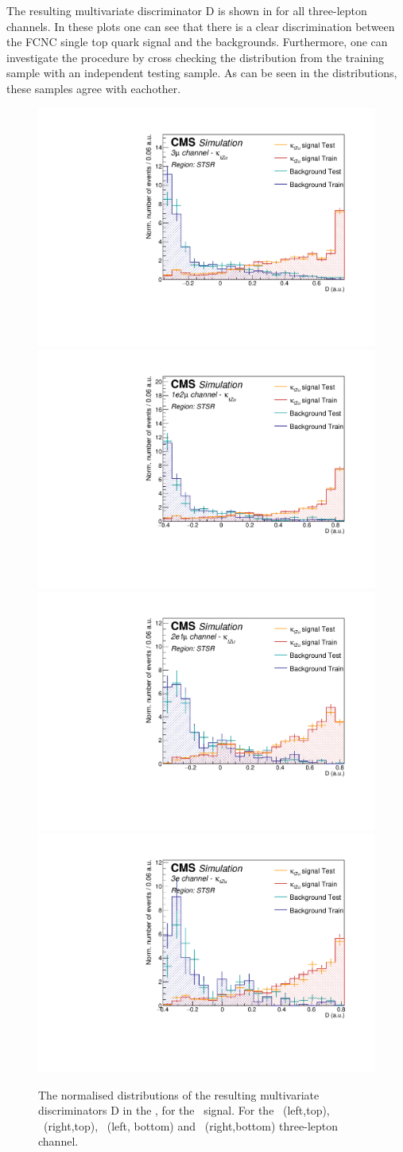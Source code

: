 \clearpage

The resulting multivariate discriminator D is shown in  for all three-lepton channels. In these plots one can see that there is a clear discrimination between the FCNC single top quark signal and the backgrounds. Furthermore, one can investigate the procedure by cross checking the distribution from the training sample with an independent testing sample. As can be seen in the distributions, these samples agree with eachother.
\begin{figure}[htbp]
	\centering
	\includegraphics[width=0.49\linewidth]{6_Search/Figures/PlotsTechnics/SigVsBkgTestZutsingletopuuu}
	\includegraphics[width=0.49\linewidth]{6_Search/Figures/PlotsTechnics/SigVsBkgTestZutsingletopuue}
	\includegraphics[width=0.49\linewidth]{6_Search/Figures/PlotsTechnics/SigVsBkgTestZutsingletopeeu}
	\includegraphics[width=0.49\linewidth]{6_Search/Figures/PlotsTechnics/SigVsBkgTestZutsingletopeee}
\caption{The normalised distributions of the resulting  multivariate discriminators D in the \STSR, for the \Zut\ signal. For the \mumumu\ (left,top), \emumu\ (right,top), \eemu\ (left, bottom) and \eee\ (right,bottom) three-lepton channel.}
	\label{fig:sigvsbkgtestzutsingletop}
\end{figure}

